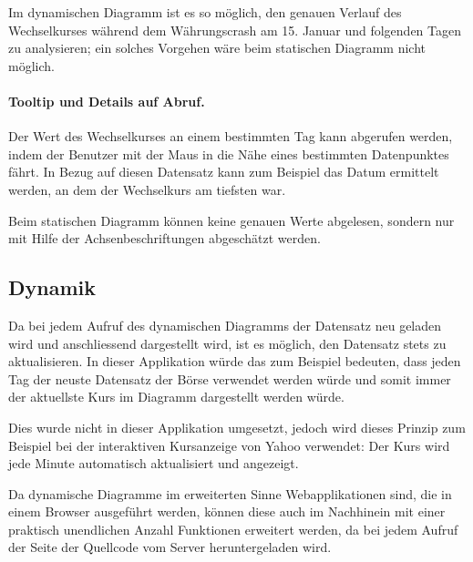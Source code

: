 Im dynamischen Diagramm ist es so möglich, den genauen Verlauf des Wechselkurses während dem Währungscrash am 15. Januar und folgenden Tagen zu analysieren; ein solches Vorgehen wäre beim statischen Diagramm nicht möglich.

\paragraph{Tooltip und Details auf Abruf.} 

Der Wert des Wechselkurses an einem bestimmten Tag kann abgerufen werden, indem der Benutzer mit der Maus in die Nähe eines bestimmten Datenpunktes fährt. In Bezug auf diesen Datensatz kann zum Beispiel das Datum ermittelt werden, an dem der Wechselkurs am tiefsten war.

Beim statischen Diagramm können keine genauen Werte abgelesen, sondern nur mit Hilfe der Achsenbeschriftungen abgeschätzt werden.

\subsection{Dynamik}

Da bei jedem Aufruf des dynamischen Diagramms der Datensatz neu geladen wird und anschliessend dargestellt wird, ist es möglich, den Datensatz stets zu aktualisieren. In dieser Applikation würde das zum Beispiel bedeuten, dass jeden Tag der neuste Datensatz der Börse verwendet werden würde und somit immer der aktuellste Kurs im Diagramm dargestellt werden würde.

Dies wurde nicht in dieser Applikation umgesetzt, jedoch wird dieses Prinzip zum Beispiel bei der interaktiven Kursanzeige von Yahoo \cite{yahoo} verwendet: Der Kurs wird jede Minute automatisch aktualisiert und angezeigt.

Da dynamische Diagramme im erweiterten Sinne Webapplikationen sind, die in einem Browser ausgeführt werden, können diese auch im Nachhinein mit einer praktisch unendlichen Anzahl Funktionen erweitert werden, da bei jedem Aufruf der Seite der Quellcode vom Server heruntergeladen wird.